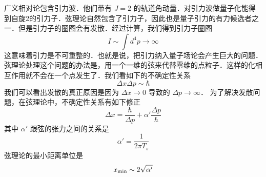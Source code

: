  
\begin{issues}
\issueNeedCite
\issueMissDepend
\end{issues}
 
 广义相对论包含引力波．他们带有 $J = 2$ 的轨道角动量．对引力波做量子化能得到自旋2的引力子．弦理论自然包含了引力子，因此也是量子引力的有力候选者之一．但是引力子的圈图会有发散．经过计算，我们得到引力子圈图
\begin{equation}
I \sim \int d^4 p \rightarrow \infty 
\end{equation}
这意味着引力是不可重整的．也就是说，把引力纳入量子场论会产生巨大的问题．弦理论处理这个问题的办法是，用一个一维的弦来代替零维的点粒子．这样的化相互作用就不会在一个点发生了．我们看如下的不确定性关系
\begin{equation}
\Delta x \Delta p \sim \hbar  
\end{equation}
我们可以看出发散的真正原因是因为 $\Delta x \rightarrow 0$ 导致的 $\Delta p \rightarrow  \infty  $．  为了解决发散问题，在弦理论中，不确定性关系有如下修正
\begin{equation}
\Delta x  = \frac{\hbar}{\Delta p} + \alpha' \frac{\Delta p}{\hbar }
\end{equation}
其中 $\alpha'$ 跟弦的张力之间的关系是
\begin{equation}
\alpha ' = \frac{1}{2 \pi T_s} 
\end{equation}
弦理论的最小距离单位是
\begin{equation}
x_{\rm min} \sim 2 \sqrt{\alpha'}
\end{equation}
